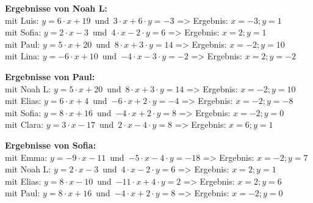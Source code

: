 \begin{minipage}{\textwidth}
\textbf{Ergebnisse von Noah L:}\\
mit Luis: $y=6\cdot x+19$\mbox{ }und\mbox{ }$3\cdot x+6\cdot y=-3$ => Ergebnis: $x=-3;y=1$
\\
mit Sofia: $y=2\cdot x-3$\mbox{ }und\mbox{ }$4\cdot x-2\cdot y=6$ => Ergebnis: $x=2;y=1$
\\
mit Paul: $y=5\cdot x+20$\mbox{ }und\mbox{ }$8\cdot x+3\cdot y=14$ => Ergebnis: $x=-2;y=10$
\\
mit Lina: $y=-6\cdot x+10$\mbox{ }und\mbox{ }$-4\cdot x-3\cdot y=-2$ => Ergebnis: $x=2;y=-2$
\\
\end{minipage}
\vspace*{3ex}

\begin{minipage}{\textwidth}
\textbf{Ergebnisse von Paul:}\\
mit Noah L: $y=5\cdot x+20$\mbox{ }und\mbox{ }$8\cdot x+3\cdot y=14$ => Ergebnis: $x=-2;y=10$
\\
mit Elias: $y=6\cdot x+4$\mbox{ }und\mbox{ }$-6\cdot x+2\cdot y=-4$ => Ergebnis: $x=-2;y=-8$
\\
mit Sofia: $y=8\cdot x+16$\mbox{ }und\mbox{ }$-4\cdot x+2\cdot y=8$ => Ergebnis: $x=-2;y=0$
\\
mit Clara: $y=3\cdot x-17$\mbox{ }und\mbox{ }$2\cdot x-4\cdot y=8$ => Ergebnis: $x=6;y=1$
\\
\end{minipage}
\vspace*{3ex}

\begin{minipage}{\textwidth}
\textbf{Ergebnisse von Sofia:}\\
mit Emma: $y=-9\cdot x-11$\mbox{ }und\mbox{ }$-5\cdot x-4\cdot y=-18$ => Ergebnis: $x=-2;y=7$
\\
mit Noah L: $y=2\cdot x-3$\mbox{ }und\mbox{ }$4\cdot x-2\cdot y=6$ => Ergebnis: $x=2;y=1$
\\
mit Elias: $y=8\cdot x-10$\mbox{ }und\mbox{ }$-11\cdot x+4\cdot y=2$ => Ergebnis: $x=2;y=6$
\\
mit Paul: $y=8\cdot x+16$\mbox{ }und\mbox{ }$-4\cdot x+2\cdot y=8$ => Ergebnis: $x=-2;y=0$
\\
\end{minipage}
